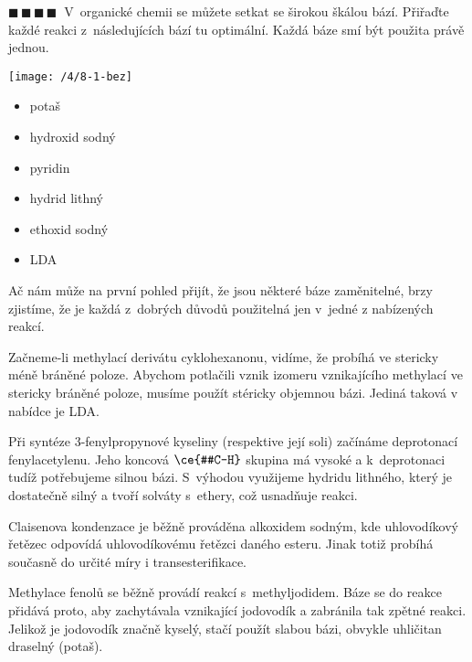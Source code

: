 \documentclass{book}
\newcommand{\ctyri}{$\blacksquare \, \blacksquare \, \blacksquare \, \blacksquare \; \; $}
\renewenvironment{quotation}{\par}{\par} %
\begin{document}
\newpage %
\begin{quotation}
\ctyri V~organické chemii se můžete
setkat se širokou škálou bází. Přiřaďte každé reakci z~následujících
bází tu optimální. Každá báze smí být použita právě jednou. 
\begin{center}

\texttt{[image: /4/8-1-bez]}

\par\end{center}
\begin{itemize}
\item potaš 
\item hydroxid sodný 
\item pyridin 
\item hydrid lithný 
\item ethoxid sodný
\item LDA
\end{itemize}
\end{quotation} \dotfill \par 
Ač nám může na první pohled přijít, že jsou některé báze zaměnitelné,
brzy zjistíme, že je každá z~dobrých důvodů použitelná jen v~jedné
z nabízených reakcí.

Začneme-li methylací derivátu cyklohexanonu, vidíme, že probíhá ve
stericky méně bráněné poloze. Abychom potlačili vznik izomeru vznikajícího
methylací ve stericky bráněné poloze, musíme použít stéricky objemnou
bázi. Jediná taková v\,nabídce je LDA. 

Při syntéze 3-fenylpropynové kyseliny (respektive její soli) začínáme
deprotonací fenylacetylenu. Jeho koncová $\ce{#C-H}$ skupina má vysoké \pKa a k~deprotonaci tudíž potřebujeme silnou bázi. S~výhodou využijeme
hydridu lithného, který je dostatečně silný a tvoří solváty s~ethery,
což usnadňuje reakci. 

Claisenova kondenzace je běžně prováděna alkoxidem sodným, kde uhlovodíkový
řetězec odpovídá uhlovodíkovému řetězci daného esteru. Jinak totiž
probíhá současně do určité míry i transesterifikace. 

Methylace fenolů se běžně provádí reakcí s~methyljodidem. Báze se
do reakce přidává proto, aby zachytávala vznikající jodovodík a zabránila
tak zpětné reakci. Jelikož je jodovodík značně kyselý, stačí použít
slabou bázi, obvykle uhličitan draselný (potaš).
\end{document}
